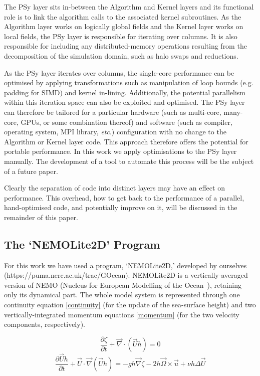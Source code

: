 \documentclass[gmd, manuscript]{copernicus}
\begin{document}
The PSy layer sits in-between the Algorithm and Kernel layers and its
functional role is to link the algorithm calls to the associated
kernel subroutines. As the Algorithm layer works on logically global
fields and the Kernel layer works on local fields, the PSy layer is
responsible for iterating over columns. It is also responsible for
including any distributed-memory operations resulting from the
decomposition of the simulation domain, such as halo swaps and
reductions.

As the PSy layer iterates over columns, the single-core performance
can be optimised by applying transformations such as manipulation of
loop bounds (e.g. padding for SIMD) and kernel
in-lining. Additionally, the potential parallelism within this
iteration space can also be exploited and optimised. The PSy layer can
therefore be tailored for a particular hardware (such as multi-core,
many-core, GPUs, or some combination thereof) and software (such as
compiler, operating system, MPI library, \textit{etc}.) configuration
with no change to the Algorithm or Kernel layer code. This approach
therefore offers the potential for portable performance. In this work
we apply optimisations to the PSy layer manually. The development of a
tool to automate this process will be the subject of a future paper.

Clearly the separation of code into distinct layers may have an effect
on performance. This overhead, how to get back to the performance of a
parallel, hand-optimised code, and potentially improve on it, will be
discussed in the remainder of this paper.

\subsection{The `NEMOLite2D' Program}

For this work we have used a program, `NEMOLite2D,' developed by
ourselves (https://puma.nerc.ac.uk/trac/GOcean).  NEMOLite2D is a
vertically-averaged version of NEMO (Nucleus for European Modelling of
the Ocean~\citep{nemo}), retaining only its dynamical part. The whole
model system is represented through one continuity equation
\eqref{continuity} (for the update of the sea-surface height) and two
vertically-integrated momentum equations \eqref{momentum} (for the two
velocity components, respectively).

\begin{equation}\label{continuity}
 \frac{\partial \zeta}{\partial t} + \vec{\nabla} \cdot (\vec{U}h) = 0
\end{equation}
\begin{equation}\label{momentum}
 \frac{\partial \vec{U}h}{\partial t}
   + \vec{U} \cdot \vec{\nabla} (\vec{U}h) = 
   - gh \vec{\nabla} \zeta - 2h \vec{\Omega} \times \vec{u}
   + \nu h \Delta \vec{U}
\end{equation}
\end{document}

